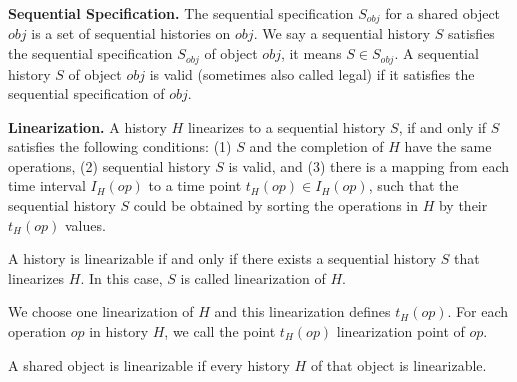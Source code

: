 \noindent \textbf{Sequential Specification.} The sequential specification $S_{obj}$ for a shared object $obj$ is a set of sequential histories on $obj$. We say a sequential history $S$ satisfies the sequential specification $S_{obj}$ of object $obj$, it means $S \in S_{obj}$. A sequential history $S$ of object $obj$ is valid (sometimes also called legal) if it satisfies the sequential specification of $obj$.

\noindent \textbf{Linearization.} A history $H$ linearizes to a sequential history $S$, if and only if $S$ satisfies the following conditions: (1) $S$ and the completion of $H$ have the same operations, (2) sequential history $S$ is valid, and (3) there is a mapping from each time interval $I_H(op)$ to a time point $t_H(op) \in I_H(op)$, such that the sequential history $S$ could be obtained by sorting the operations in $H$ by their $t_H(op)$ values.

A history is linearizable if and only if there exists a sequential history $S$ that linearizes $H$. In this case, $S$ is called linearization of $H$.

We choose one linearization of $H$ and this linearization defines $t_H(op)$. For each operation $op$ in history $H$, we call the point $t_H(op)$ linearization point of $op$.

A shared object is linearizable if every history $H$ of that object is linearizable.



